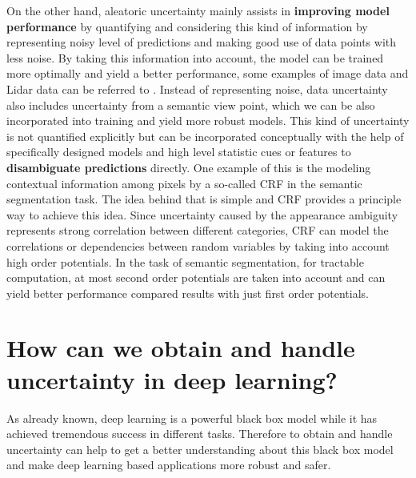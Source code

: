 On the other hand, aleatoric uncertainty mainly assists in \textbf{improving model performance} by quantifying and considering this kind of information by representing noisy level of predictions and making good use of data points with less noise. By taking this information into account, the model can be trained more optimally and yield a better performance, some examples of image data and Lidar data can be referred to \cite{kendall2016modelling}\cite{feng2018towards}. Instead of representing noise, data uncertainty also includes uncertainty from a semantic view point, which we can be also incorporated into training and yield more robust models. This kind of uncertainty is not quantified explicitly but can be incorporated conceptually with the help of specifically designed models and high level statistic cues or features to \textbf{disambiguate predictions} directly. One example of this is the modeling contextual information among pixels by a so-called \gls{CRF} 
in the semantic segmentation task\cite{krahenbuhl2011efficient}\cite{sutton2012introduction}\cite{lin2016efficient}. The idea behind that is simple and \gls{CRF} provides a principle way to achieve this idea. Since uncertainty caused by the appearance ambiguity represents strong correlation between different categories, \gls{CRF} can model the correlations or dependencies between random variables by taking into account high order potentials. In the task of semantic segmentation, for tractable computation, at most second order potentials are taken into account and can yield better performance compared results with just first order potentials. 
\section{How can we obtain and handle uncertainty in deep learning?}
As already known, deep learning is a powerful black box model while it has achieved tremendous success in different tasks. Therefore to obtain and handle uncertainty can help to get a better understanding about this black box model and make deep learning based applications more robust and safer. 

